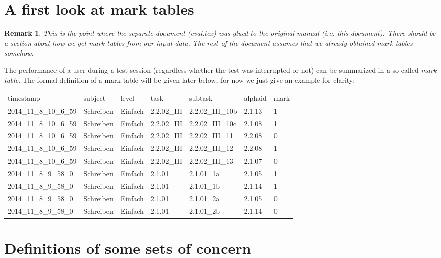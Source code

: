 \documentclass{scrartcl}
\newtheorem{remark}{Remark}
\begin{document}
\section{A first look at mark tables}\label{sec:intro}
\begin{remark}
This is the point where the separate document (eval.tex) was glued to the original manual (i.e. this document). There should be a section about how we get mark tables from our input data. The rest of the document assumes that we already obtained mark tables somehow.
\end{remark}

The performance of a user during a test-session (regardless whether the test was interrupted or not) can be summarized in a so-called \emph{mark table}. The formal definition of a mark table will be given later below, for now we just give an example for clarity:

\vspace{.5cm}
\begin{tabular}{lllllll}
timestamp	& subject	& level	& task	& subtask	& alphaid	& mark\\
2014\_11\_8\_10\_6\_59	& Schreiben	& Einfach	& 2.2.02\_III	& 2.2.02\_III\_10b	& 2.1.13	& 1\\
2014\_11\_8\_10\_6\_59	& Schreiben	& Einfach	& 2.2.02\_III	& 2.2.02\_III\_10c	& 2.1.08	& 1\\
2014\_11\_8\_10\_6\_59	& Schreiben	& Einfach	& 2.2.02\_III	& 2.2.02\_III\_11	& 2.2.08	& 0\\
2014\_11\_8\_10\_6\_59	& Schreiben	& Einfach	& 2.2.02\_III	& 2.2.02\_III\_12	& 2.2.08	& 1\\
2014\_11\_8\_10\_6\_59	& Schreiben	& Einfach	& 2.2.02\_III	& 2.2.02\_III\_13	& 2.1.07	& 0\\
2014\_11\_8\_9\_58\_0	& Schreiben	& Einfach	& 2.1.01	& 2.1.01\_1a	& 2.1.05	& 1\\
2014\_11\_8\_9\_58\_0	& Schreiben	& Einfach	& 2.1.01	& 2.1.01\_1b	& 2.1.14	& 1\\
2014\_11\_8\_9\_58\_0	& Schreiben	& Einfach	& 2.1.01	& 2.1.01\_2a	& 2.1.05	& 0\\
2014\_11\_8\_9\_58\_0	& Schreiben	& Einfach	& 2.1.01	& 2.1.01\_2b	& 2.1.14	& 0\\
\end{tabular}

\section{Definitions of some sets of concern}
\end{document}
